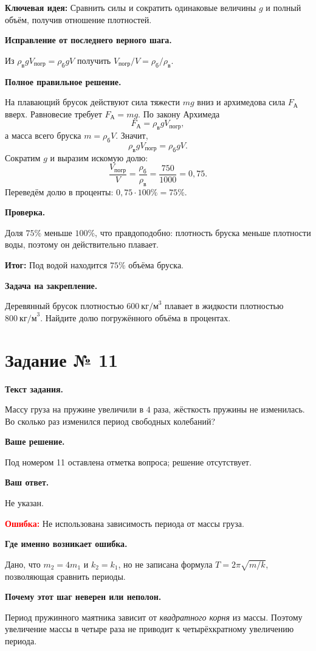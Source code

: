 \documentclass[11pt,a4paper]{article}
\newcommand{\reviewblock}[2]{\par\medskip\noindent\textbf{#1}\par\noindent#2\par}
\newcommand{\errorblock}[1]{\par\medskip\noindent\textcolor{red}{\textbf{Ошибка:}} #1\par}
\newcommand{\ideablock}[1]{\par\medskip\noindent\textcolor{blue!60!black}{\textbf{Ключевая идея:}} #1\par}
\newcommand{\resultblock}[1]{\par\medskip\noindent\textcolor{teal!60!black}{\textbf{Итог:}} #1\par}
\begin{document}
\ideablock{Сравнить силы и сократить одинаковые величины $g$ и полный объём, получив отношение плотностей.}

\reviewblock{Исправление от последнего верного шага.}{Из $\rho_{\text{в}}gV_{\text{погр}}=\rho_{\text{б}}gV$ получить $V_{\text{погр}}/V=\rho_{\text{б}}/\rho_{\text{в}}$.}

\reviewblock{Полное правильное решение.}{На плавающий брусок действуют сила тяжести $mg$ вниз и архимедова сила $F_{\text{А}}$ вверх. Равновесие требует $F_{\text{А}}=mg$. По закону Архимеда
\[F_{\text{А}}=\rho_{\text{в}}gV_{\text{погр}},\]
а масса всего бруска $m=\rho_{\text{б}}V$. Значит,
\[\rho_{\text{в}}gV_{\text{погр}}=\rho_{\text{б}}gV.\]
Сократим $g$ и выразим искомую долю:
\[\frac{V_{\text{погр}}}{V}=\frac{\rho_{\text{б}}}{\rho_{\text{в}}}=\frac{750}{1000}=0{,}75.\]
Переведём долю в проценты: $0{,}75\cdot100\%=75\%$.}

\reviewblock{Проверка.}{Доля $75\%$ меньше $100\%$, что правдоподобно: плотность бруска меньше плотности воды, поэтому он действительно плавает.}

\resultblock{Под водой находится $75\%$ объёма бруска.}

\reviewblock{Задача на закрепление.}{Деревянный брусок плотностью $600\ \text{кг/м}^3$ плавает в жидкости плотностью $800\ \text{кг/м}^3$. Найдите долю погружённого объёма в процентах.}
\newpage
{}\label{task:11}

\section*{Задание № 11}

\reviewblock{Текст задания.}{Массу груза на пружине увеличили в $4$ раза, жёсткость пружины не изменилась. Во сколько раз изменился период свободных колебаний?}

\reviewblock{Ваше решение.}{Под номером 11 оставлена отметка вопроса; решение отсутствует.}

\reviewblock{Ваш ответ.}{Не указан.}

\errorblock{Не использована зависимость периода от массы груза.}

\reviewblock{Где именно возникает ошибка.}{Дано, что $m_2=4m_1$ и $k_2=k_1$, но не записана формула $T=2\pi\sqrt{m/k}$, позволяющая сравнить периоды.}

\reviewblock{Почему этот шаг неверен или неполон.}{Период пружинного маятника зависит от \emph{квадратного корня} из массы. Поэтому увеличение массы в четыре раза не приводит к четырёхкратному увеличению периода.}
\end{document}
